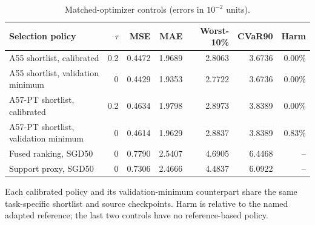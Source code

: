 \begin{table}[!htbp]
\centering\footnotesize
\caption{Matched-optimizer controls (errors in $10^{-2}$ units).}\label{tab:s-matched}
\begin{tabular}{lrrrrrr}
\toprule
Selection policy & $\tau$ & MSE & MAE & Worst-10\% & CVaR90 & Harm\\\midrule
A55 shortlist, calibrated & 0.2 & 0.4472 & 1.9689 & 2.8063 & 3.6736 & 0.00\%\\
A55 shortlist, validation minimum & 0 & 0.4429 & 1.9353 & 2.7722 & 3.6736 & 0.00\%\\
A57-PT shortlist, calibrated & 0.2 & 0.4634 & 1.9798 & 2.8973 & 3.8389 & 0.00\%\\
A57-PT shortlist, validation minimum & 0 & 0.4614 & 1.9629 & 2.8837 & 3.8389 & 0.83\%\\
Fused ranking, SGD50 & 0 & 0.7790 & 2.5407 & 4.6905 & 6.4468 & --\\
Support proxy, SGD50 & 0 & 0.7306 & 2.4666 & 4.4837 & 6.0922 & --\\
\bottomrule\end{tabular}
\par\vspace{3pt}\begin{minipage}{\linewidth}\footnotesize Each calibrated policy and its validation-minimum counterpart share the same task-specific shortlist and source checkpoints. Harm is relative to the named adapted reference; the last two controls have no reference-based policy.\end{minipage}
\end{table}
